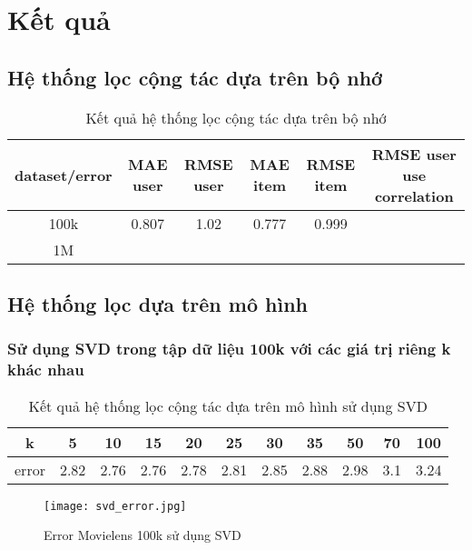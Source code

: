 \chapter{Kết quả}
\section{Hệ thống lọc cộng tác dựa trên bộ nhớ}
\begin{table}[H]
\caption{Kết quả hệ thống lọc cộng tác dựa trên bộ nhớ}
\label{table:3}
\begin{center}
\begin{tabular}{|c|c|c|c|c|c|}
\hline 
dataset/error & MAE user & RMSE user & MAE item & RMSE item & RMSE user use correlation \\ 
\hline 
100k & 0.807 & 1.02 & 0.777 & 0.999 \\ 
\hline 
1M \\ 
\hline 
\end{tabular}
\end{center}
\end{table}

\section{Hệ thống lọc dựa trên mô hình}
\subsection{Sử dụng SVD trong tập dữ liệu 100k với các giá trị riêng k khác nhau}
\begin{table}[H]
\caption{Kết quả hệ thống lọc cộng tác dựa trên mô hình sử dụng SVD}
\label{table:4}
\begin{center}
\begin{tabular}{|c|c|c|c|c|c|c|c|c|c|c|}
\hline 
k & 5 & 10 & 15 & 20 & 25 & 30 & 35 & 50 & 70 & 100 \\ 
\hline 
error & 2.82 & 2.76 & 2.76 & 2.78 & 2.81 & 2.85 & 2.88 & 2.98 & 3.1 & 3.24 \\ 
\hline 
\end{tabular}
\end{center}
\end{table}

\begin{center}
\begin{figure}[H]
	\centering
	\texttt{[image: svd\_error.jpg]}
	\caption{Error Movielens 100k sử dụng SVD}
	\label{fig:SVD for Movielens 100k}
\end{figure}
\end{center}